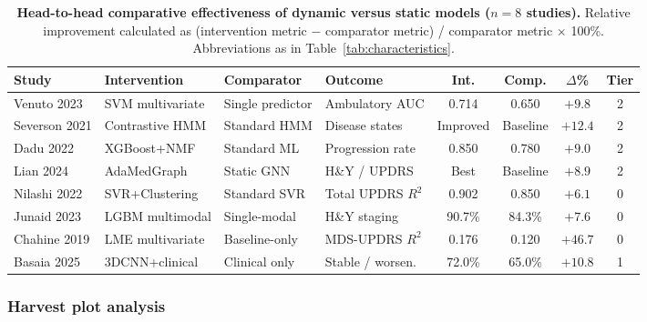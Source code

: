 \documentclass[11pt,a4paper]{article}
\begin{document}
\begin{table}[H]
\centering
\caption{\textbf{Head-to-head comparative effectiveness of dynamic versus static models ($n=8$ studies).} Relative improvement calculated as (intervention metric $-$ comparator metric) / comparator metric $\times$ 100\%. Abbreviations as in Table~\ref{tab:characteristics}.}
\label{tab:comparative}
\footnotesize
\setlength{\tabcolsep}{3.5pt}
\begin{tabularx}{\textwidth}{@{}l l l >{\raggedright\arraybackslash}X c c c c@{}}
\toprule
\textbf{Study} & \textbf{Intervention} & \textbf{Comparator} & \textbf{Outcome} & \textbf{Int.} & \textbf{Comp.} & \textbf{$\Delta$\%} & \textbf{Tier} \\
\midrule
Venuto 2023 & SVM multivariate & Single predictor & Ambulatory AUC & 0.714 & 0.650 & $+9.8$ & 2 \\
Severson 2021 & Contrastive HMM & Standard HMM & Disease states & Improved & Baseline & $+12.4$ & 2 \\
Dadu 2022 & XGBoost+NMF & Standard ML & Progression rate & 0.850 & 0.780 & $+9.0$ & 2 \\
Lian 2024 & AdaMedGraph & Static GNN & H\&Y / UPDRS & Best & Baseline & $+8.9$ & 2 \\
Nilashi 2022 & SVR+Clustering & Standard SVR & Total UPDRS $R^2$ & 0.902 & 0.850 & $+6.1$ & 0 \\
Junaid 2023 & LGBM multimodal & Single-modal & H\&Y staging & 90.7\% & 84.3\% & $+7.6$ & 0 \\
Chahine 2019 & LME multivariate & Baseline-only & MDS-UPDRS $R^2$ & 0.176 & 0.120 & $+46.7$ & 0 \\
Basaia 2025 & 3DCNN+clinical & Clinical only & Stable / worsen. & 72.0\% & 65.0\% & $+10.8$ & 1 \\
\bottomrule
\end{tabularx}
\end{table}

\subsubsection{Harvest plot analysis}
\end{document}

